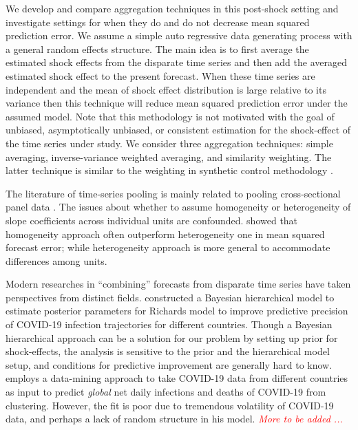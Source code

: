\documentclass[11pt]{article}
\theoremstyle{definition}
\begin{document}
We develop and compare aggregation techniques in this post-shock setting and 
investigate settings for when they do and do not decrease mean squared 
prediction error. We assume a simple auto regressive data generating process 
with a general random effects structure. The main idea is to first average 
the estimated shock effects from the disparate time series and then add 
the averaged estimated shock effect to the present forecast. When these 
time series are independent and the mean of shock effect distribution is 
large relative to its variance then this technique will reduce mean squared 
prediction error under the assumed model. Note that this methodology is not 
motivated with the goal of unbiased, asymptotically unbiased, or consistent 
estimation for the shock-effect of the time series under study. We consider 
three aggregation techniques: simple averaging, inverse-variance weighted 
averaging, and similarity weighting. The latter technique is similar to 
the weighting in synthetic control methodology \citep{abadie2010synthetic}.



 The literature of time-series pooling is mainly related to pooling cross-sectional panel data \citep{mundlak1978pooling, zellner1991forecasting, fosten2019panel}. The issues about whether to assume homogeneity or heterogeneity of slope coefficients across individual units are confounded. \citet{baltagi2008forecasting} showed that homogeneity approach often outperform   heterogeneity one in mean squared forecast error; while heterogeneity approach is more general to accommodate differences among units.


Modern researches in ``combining'' forecasts from disparate time series have taken perspectives from distinct fields.  \citet{lee2020estimation} constructed a Bayesian hierarchical model  to estimate posterior parameters for Richards model to improve predictive precision of COVID-19 infection trajectories for different countries. Though a Bayesian hierarchical approach can be a solution for our problem by setting up prior for shock-effects, the analysis is sensitive to the prior and the hierarchical model setup, and conditions for predictive improvement are generally hard to know. \citet{plessen2020integrated} employs a data-mining approach to take COVID-19 data from different countries as input to predict \emph{global} net daily infections  and deaths of COVID-19 from clustering. However, the fit is poor due to tremendous volatility of COVID-19 data, and perhaps a lack of random structure in his model. \emph{\textcolor{red}{More to be added ...}}
\end{document}
